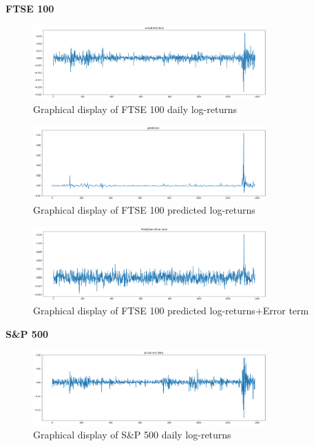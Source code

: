 \documentclass[a4paper,11pt,oneside]{book}
\begin{document}
\textbf{FTSE 100}
\begin{figure}[!h]
	\centering
	\includegraphics[width=0.8\textwidth]{figures/FTSETEST}
	\caption{Graphical display of FTSE 100 daily log-returns}
	\label{FTSETEST}
\end{figure}

\begin{figure}[!h]
	\centering
	\includegraphics[width=0.8\textwidth]{figures/FTSEPRED}
	\caption{Graphical display of FTSE 100 predicted log-returns}
	\label{FTSEPRED}
\end{figure}


\begin{figure}[!h]
	\centering
	\includegraphics[width=0.8\textwidth]{figures/FTSEERROR}
	\caption{Graphical display of FTSE 100 predicted log-returns+Error term}
	\label{FTSEERROR}
\end{figure}
\newpage

\textbf{S\&P 500}

\begin{figure}[!h]
	\centering
	\includegraphics[width=0.8\textwidth]{figures/sanptest}
	\caption{Graphical display of S\&P 500 daily log-returns}
	\label{sanptest}
\end{figure}
\end{document}
